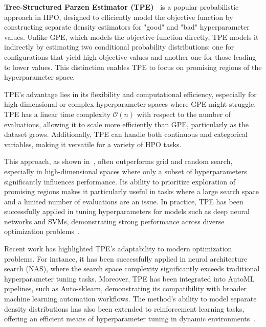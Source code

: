 \textbf{Tree-Structured Parzen Estimator (TPE)~\cite{10.5555/2986459.2986743}} is a popular probabilistic approach in HPO, designed to efficiently model the objective function by constructing separate density estimators for "good" and "bad" hyperparameter values. Unlike GPE, which models the objective function directly, TPE models it indirectly by estimating two conditional probability distributions: one for configurations that yield high objective values and another one for those leading to lower values. This distinction enables TPE to focus on promising regions of the hyperparameter space.

TPE’s advantage lies in its flexibility and computational efficiency, especially for high-dimensional or complex hyperparameter spaces where GPE might struggle. TPE has a linear time complexity $\mathcal{O}(n)$ with respect to the number of evaluations, allowing it to scale more efficiently than GPE, particularly as the dataset grows. Additionally, TPE can handle both continuous and categorical variables, making it versatile for a variety of HPO tasks.

This approach, as shown in~\cite{10.5555/2986459.2986743}, often outperforms grid and random search, especially in high-dimensional spaces where only a subset of hyperparameters significantly influences performance. Its ability to prioritize exploration of promising regions makes it particularly useful in tasks where a large search space and a limited number of evaluations are an issue. In practice, TPE has been successfully applied in tuning hyperparameters for models such as deep neural networks and SVMs, demonstrating strong performance across diverse optimization problems~\cite{bergstra2012makingsciencemodelsearch}.

Recent work has highlighted TPE's adaptability to modern optimization problems. For instance, it has been successfully applied in neural architecture search (NAS)\cite{zoph2017neuralarchitecturesearchreinforcement}, where the search space complexity significantly exceeds traditional hyperparameter tuning tasks. Moreover, TPE has been integrated into AutoML pipelines, such as Auto-sklearn\cite{NIPS2015_11d0e628}, demonstrating its compatibility with broader machine learning automation workflows. The method's ability to model separate density distributions has also been extended to reinforcement learning tasks, offering an efficient means of hyperparameter tuning in dynamic environments~\cite{Henderson_Islam_Bachman_Pineau_Precup_Meger_2018}.